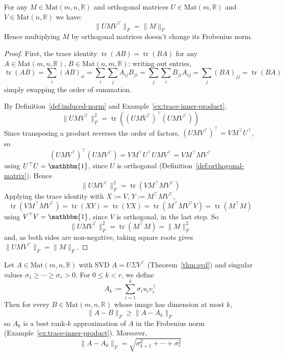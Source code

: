 	\begin{lemma}
		\label{lem:invariance-of-frobenius}
		For any $M \in \mathrm{Mat}(m, n, \mathbb{R})$ and orthogonal matrices $U \in \mathrm{Mat}(m, \mathbb{R})$ and $V \in \mathrm{Mat}(n, \mathbb{R})$ we have:
		\[
			\|UMV^\top\|_F = \|M\|_F
		\]
		Hence multiplying $M$ by orthogonal matrices doesn't change its Frobenius norm.
	\end{lemma}
	
	\begin{proof}
		First, the trace identity $\operatorname{tr}(AB)=\operatorname{tr}(BA)$ for any $A\in\mathrm{Mat}(m,n,\mathbb{R})$, $B\in\mathrm{Mat}(n,m,\mathbb{R})$: writing out entries,
		\[
			\operatorname{tr}(AB) = \sum_i (AB)_{ii} = \sum_i\sum_j A_{ij}B_{ji} = \sum_j\sum_i B_{ji}A_{ij} = \sum_j (BA)_{jj} = \operatorname{tr}(BA)
		\]
		simply swapping the order of summation.
		
		By Definition~\ref{def:induced-norm} and Example~\ref{ex:trace-inner-product},
		\[
			\|UMV^\top\|_F^2 = \operatorname{tr}\left((UMV^\top)^\top(UMV^\top)\right)
		\]
		Since transposing a product reverses the order of factors, $(UMV^\top)^\top = VM^\top U^\top$, so
		\[
			(UMV^\top)^\top(UMV^\top) = VM^\top U^\top UMV^\top = VM^\top MV^\top
		\]
		using $U^\top U = \mathbbm{1}$, since $U$ is orthogonal (Definition~\ref{def:orthogonal-matrix}). Hence
		\[
			\|UMV^\top\|_F^2 = \operatorname{tr}(VM^\top MV^\top)
		\]
		Applying the trace identity with $X:=V$, $Y:=M^\top MV^\top$,
		\[
			\operatorname{tr}(VM^\top MV^\top) = \operatorname{tr}(XY) = \operatorname{tr}(YX) = \operatorname{tr}(M^\top MV^\top V) = \operatorname{tr}(M^\top M)
		\]
		using $V^\top V=\mathbbm{1}$, since $V$ is orthogonal, in the last step. So
		\[
			\|UMV^\top\|_F^2 = \operatorname{tr}(M^\top M) = \|M\|_F^2
		\]
		and, as both sides are non-negative, taking square roots gives $\|UMV^\top\|_F = \|M\|_F$.
	\end{proof}
	
	\begin{theorem}
		\label{thm:eckart-young}
		Let $A \in \mathrm{Mat}(m,n,\mathbb{R})$ with SVD $A=U\Sigma V^\top$ (Theorem~\ref{thm:svd}) and singular values $\sigma_1\ge\cdots\ge\sigma_r>0$. For $0\le k<r$, we define
		\[
			A_k := \sum_{i=1}^{k} \sigma_i u_i v_i^\top
		\]
		Then for every $B \in \mathrm{Mat}(m,n,\mathbb{R})$ whose image has dimension at most $k$,
		\[
			\|A-B\|_F \ge \|A-A_k\|_F
		\]
		so $A_k$ is a best rank-$k$ approximation of $A$ in the Frobenius norm (Example~\ref{ex:trace-inner-product}). Moreover,
		\[
			\|A-A_k\|_F = \sqrt{\sigma_{k+1}^2+\cdots+\sigma_r^2}
		\]
	\end{theorem}
	
